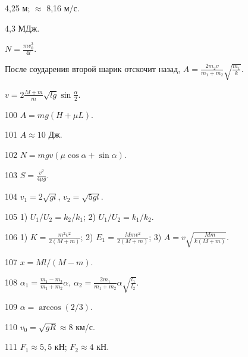 \begin{Answer}{95}
4,25 м; $\approx$ 8,16 м/с.
\end{Answer}
\begin{Answer}{96}
4,3 МДж.
\end{Answer}
\begin{Answer}{97}
$N =\frac{mv_{0}^3}{4l}$.
\end{Answer}
\begin{Answer}{98}
После соударения второй шарик отскочит назад, $A = \frac{2m_2v}{m_1+m_2}\sqrt{\frac{m_1}{k}}$.
\end{Answer}
\begin{Answer}{99}
$v = 2\frac{M+m}{m}\sqrt{lg}\sin \frac{\alpha}{2}$.
\end{Answer}
\begin{Answer}{100}
$A=mg(H+\mu L)$.
\end{Answer}
\begin{Answer}{101}
$A \approx 10$ Дж.
\end{Answer}
\begin{Answer}{102}
$N = mgv(\mu \cos \alpha +\sin \alpha)$.
\end{Answer}
\begin{Answer}{103}
$S = \frac{v^2}{4 \mu g}$.
\end{Answer}
\begin{Answer}{104}
$v_1 = 2\sqrt{gl}$, $v_2 = \sqrt{5gl}$.
\end{Answer}
\begin{Answer}{105}
1) $U_1/U_2 = k_2/k_1$; 2) $U_1/U_2 = k_1/k_2$.
\end{Answer}
\begin{Answer}{106}
1) $K=\frac{m^2v^2}{2(M+m)}$; 2) $E_1 = \frac{Mmv^2}{2(M+m)}$; 3) $A = v\sqrt{\frac{Mm}{k(M+m)}}$.
\end{Answer}
\begin{Answer}{107}
$x = Ml/(M-m)$.
\end{Answer}
\begin{Answer}{108}
$\alpha_1 =\frac{m_1-m_2}{m_1+m_2}\alpha$, $\alpha_2 =\frac{2m_1}{m_1+m_2}\alpha \sqrt{\frac{l_1}{l_2}}$.
\end{Answer}
\begin{Answer}{109}
$\alpha = \arccos(2/3)$.
\end{Answer}
\begin{Answer}{110}
$v_0 = \sqrt{gR} \approx 8$ км/с.
\end{Answer}
\begin{Answer}{111}
$F_1 \approx 5,5$ кН; $F_2 \approx 4$ кН.
\end{Answer}
